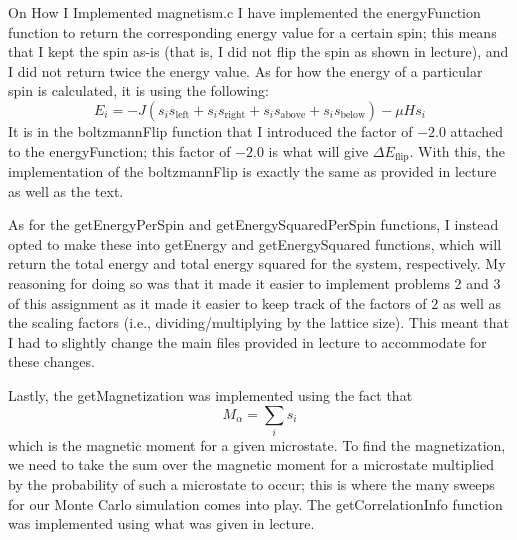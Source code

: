 \begin{remarkBox}{On How I Implemented magnetism.c}
I have implemented the energyFunction function to return the corresponding
energy value for a certain spin; this means that I kept the spin as-is (that is,
I did not flip the spin as shown in lecture), and I did not return twice the energy 
value. 
As for how the energy of a particular spin is calculated, it is using the following:
\begin{equation*}
    E_{ i }
    =
    - J ( s_{ i } s_{ \text{left} } + s_{ i } s_{ \text{right} }
    + s_{ i } s_{ \text{above} } + s_{ i } s_{ \text{below} } )
    - \mu H s_{ i }
\end{equation*}
It is in the boltzmannFlip function that I introduced the factor of \( - 2.0 \) attached
to the energyFunction; this factor of \( - 2.0 \) is what will give 
\( \Delta E_{ \text{flip} } \). 
With this, the implementation of the boltzmannFlip is exactly the same as provided in 
lecture as well as the text.

\baseSkip

As for the getEnergyPerSpin and getEnergySquaredPerSpin functions, I instead opted 
to make these into getEnergy and getEnergySquared functions, which will return the 
total energy and total energy squared for the system, respectively.
My reasoning for doing so was that it made it easier to implement problems 2 and 3 of 
this assignment as it made it easier to keep track of the factors of \( 2 \) as well 
as the scaling factors (i.e., dividing/multiplying by the lattice size).
This meant that I had to slightly change the main files provided in lecture to 
accommodate for these changes. 

\baseSkip

Lastly, the getMagnetization was implemented using the fact that 
\begin{equation*}
    M_{ \alpha }
    =
    \sum_{ i } s_{ i }
\end{equation*}
which is the magnetic moment for a given microstate.
To find the magnetization, 
we need to take the sum over the magnetic moment for a microstate multiplied by the 
probability of such a microstate to occur; this is where the many sweeps for our 
Monte Carlo simulation comes into play. 
The getCorrelationInfo function was implemented using what was given in lecture.
\end{remarkBox}